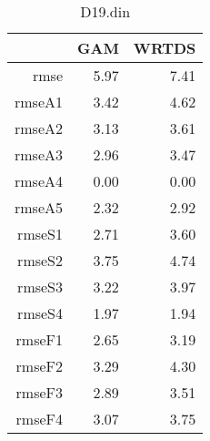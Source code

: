 \documentclass[12pt]{amsart}
\begin{document}
\begin{table}[H]
\centering
\begin{tabular}{rrr}
  \hline
 & GAM & WRTDS \\ 
  \hline
rmse & 5.97 & 7.41 \\ 
  rmseA1 & 3.42 & 4.62 \\ 
  rmseA2 & 3.13 & 3.61 \\ 
  rmseA3 & 2.96 & 3.47 \\ 
  rmseA4 & 0.00 & 0.00 \\ 
  rmseA5 & 2.32 & 2.92 \\ 
  rmseS1 & 2.71 & 3.60 \\ 
  rmseS2 & 3.75 & 4.74 \\ 
  rmseS3 & 3.22 & 3.97 \\ 
  rmseS4 & 1.97 & 1.94 \\ 
  rmseF1 & 2.65 & 3.19 \\ 
  rmseF2 & 3.29 & 4.30 \\ 
  rmseF3 & 2.89 & 3.51 \\ 
  rmseF4 & 3.07 & 3.75 \\ 
   \hline
\end{tabular}
\caption{D19.din}
\end{table}
\end{document}
